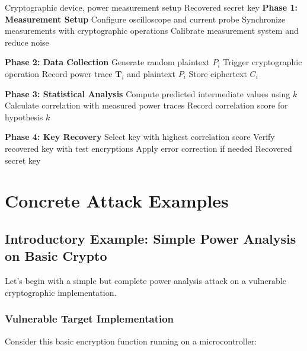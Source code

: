 \documentclass[11pt,a4paper]{article}
\theoremstyle{definition}
\begin{document}
\begin{algorithm}
\caption{General Power Analysis Attack}
\begin{algorithmic}[1]
\REQUIRE Cryptographic device, power measurement setup
\ENSURE Recovered secret key
\STATE \textbf{Phase 1: Measurement Setup}
\STATE Configure oscilloscope and current probe
\STATE Synchronize measurements with cryptographic operations
\STATE Calibrate measurement system and reduce noise

\STATE \textbf{Phase 2: Data Collection}
    \STATE Generate random plaintext $P_i$
    \STATE Trigger cryptographic operation
    \STATE Record power trace $\mathbf{T}_i$ and plaintext $P_i$
    \STATE Store ciphertext $C_i$
\ENDFOR

\STATE \textbf{Phase 3: Statistical Analysis}
    \STATE Compute predicted intermediate values using $k$
    \STATE Calculate correlation with measured power traces
    \STATE Record correlation score for hypothesis $k$
\ENDFOR

\STATE \textbf{Phase 4: Key Recovery}
\STATE Select key with highest correlation score
\STATE Verify recovered key with test encryptions
\STATE Apply error correction if needed
\RETURN Recovered secret key
\end{algorithmic}
\end{algorithm}

\section{Concrete Attack Examples}

\subsection{Introductory Example: Simple Power Analysis on Basic Crypto}

Let's begin with a simple but complete power analysis attack on a vulnerable cryptographic implementation.

\subsubsection{Vulnerable Target Implementation}

Consider this basic encryption function running on a microcontroller:
\end{document}
